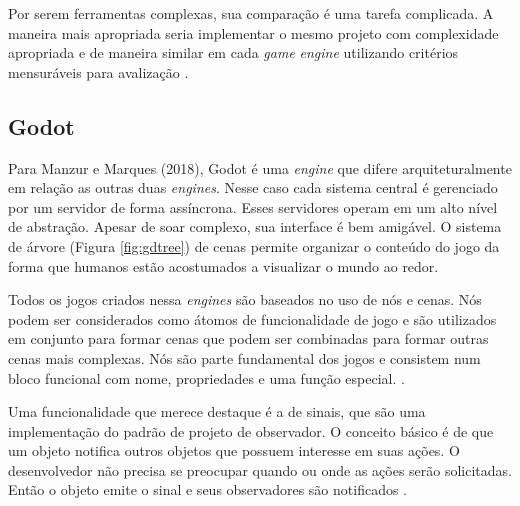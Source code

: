 Por serem ferramentas complexas, sua comparação é uma tarefa complicada. A maneira mais apropriada seria implementar o mesmo projeto com complexidade apropriada e de maneira similar em cada \textit{game} \textit{engine} utilizando critérios mensuráveis para avalização \cite{vsmid2017comparison}.  

\subsection{Godot}
\label{sec:godot}

Para Manzur e Marques (2018), Godot é uma \textit{engine} que difere arquiteturalmente em relação as outras duas \textit{engines}. Nesse caso cada sistema central é gerenciado por um servidor de forma assíncrona. Esses servidores operam em um alto nível de abstração. Apesar de soar complexo, sua interface é bem amigável. O sistema de árvore (Figura \ref{fig:gdtree}) de cenas permite organizar o conteúdo do jogo da forma que humanos estão acostumados a visualizar o mundo ao redor.

\begin{figure}[h!]
	\centering
\end{figure}
\nocite{gdtree}

Todos os jogos criados nessa \textit{engines} são baseados no uso de nós e cenas. Nós podem ser considerados como átomos de funcionalidade de jogo e são utilizados em conjunto para formar cenas que podem ser combinadas para formar outras cenas mais complexas. Nós são parte fundamental dos jogos e consistem num bloco funcional com nome, propriedades e uma função especial. \cite{godotEngine}.

Uma funcionalidade que merece destaque é a de sinais, que são uma implementação do padrão de projeto de observador. O conceito básico é de que um objeto notifica outros objetos que possuem interesse em suas ações. O desenvolvedor não precisa se preocupar quando ou onde as ações serão solicitadas. Então o objeto emite o sinal e seus observadores são notificados \cite{godotEngine}.

